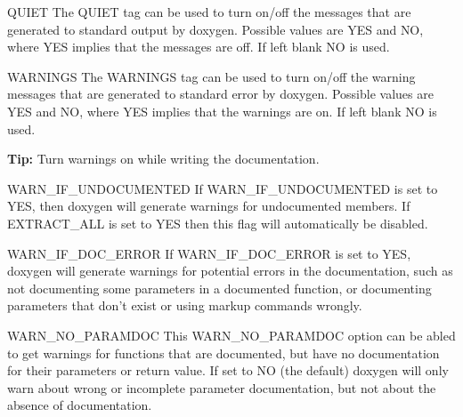 \begin{DoxyDescription}
\item[{\ttfamily QUIET} ] The {\ttfamily QUIET} tag can be used to turn on/off the messages that are generated to standard output by doxygen. Possible values are {\ttfamily YES} and {\ttfamily NO}, where {\ttfamily YES} implies that the messages are off. If left blank {\ttfamily NO} is used.

\label{config_cfg_warnings}
\hypertarget{config_cfg_warnings}{}
 
\item[{\ttfamily WARNINGS} ] The {\ttfamily WARNINGS} tag can be used to turn on/off the warning messages that are generated to standard error by doxygen. Possible values are {\ttfamily YES} and {\ttfamily NO}, where {\ttfamily YES} implies that the warnings are on. If left blank {\ttfamily NO} is used.

{\bfseries Tip:} Turn warnings on while writing the documentation.

\label{config_cfg_warn_if_undocumented}
\hypertarget{config_cfg_warn_if_undocumented}{}
 
\item[{\ttfamily WARN\_\-IF\_\-UNDOCUMENTED} ] If {\ttfamily WARN\_\-IF\_\-UNDOCUMENTED} is set to {\ttfamily YES}, then doxygen will generate warnings for undocumented members. If {\ttfamily EXTRACT\_\-ALL} is set to {\ttfamily YES} then this flag will automatically be disabled.

\label{config_cfg_warn_if_doc_error}
\hypertarget{config_cfg_warn_if_doc_error}{}
 
\item[{\ttfamily WARN\_\-IF\_\-DOC\_\-ERROR} ] If {\ttfamily WARN\_\-IF\_\-DOC\_\-ERROR} is set to {\ttfamily YES}, doxygen will generate warnings for potential errors in the documentation, such as not documenting some parameters in a documented function, or documenting parameters that don't exist or using markup commands wrongly.

\label{config_cfg_warn_no_paramdoc}
\hypertarget{config_cfg_warn_no_paramdoc}{}
 
\item[{\ttfamily WARN\_\-NO\_\-PARAMDOC} ] This {\ttfamily WARN\_\-NO\_\-PARAMDOC} option can be abled to get warnings for functions that are documented, but have no documentation for their parameters or return value. If set to {\ttfamily NO} (the default) doxygen will only warn about wrong or incomplete parameter documentation, but not about the absence of documentation.


\end{DoxyDescription}
